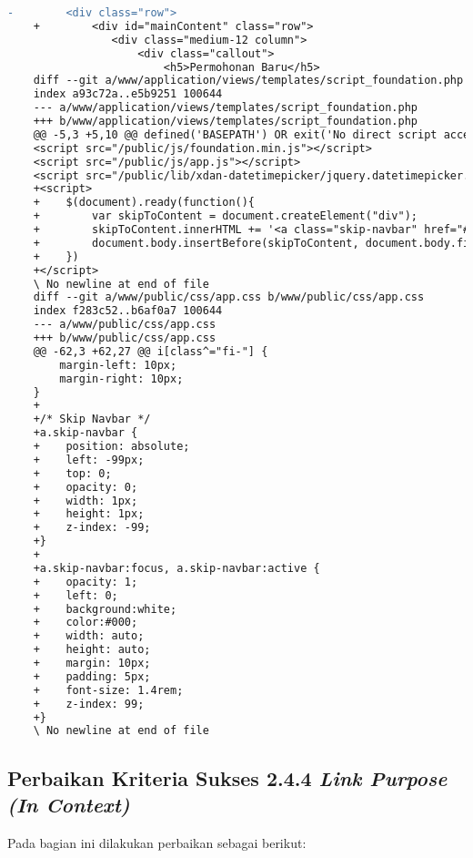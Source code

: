 \begin{lstlisting}[frame=single, label={lst:perbaikan_2.4.1_bypass_blocks}, language=diff, caption=Perbaikan Kriteria Sukses 2.4.1 - Mekanisme untuk Melompati Area Konten yang Berulang]
    -        <div class="row">
    +        <div id="mainContent" class="row">
                <div class="medium-12 column">
                    <div class="callout">
                        <h5>Permohonan Baru</h5>
    diff --git a/www/application/views/templates/script_foundation.php b/www/application/views/templates/script_foundation.php
    index a93c72a..e5b9251 100644
    --- a/www/application/views/templates/script_foundation.php
    +++ b/www/application/views/templates/script_foundation.php
    @@ -5,3 +5,10 @@ defined('BASEPATH') OR exit('No direct script access allowed');
    <script src="/public/js/foundation.min.js"></script>
    <script src="/public/js/app.js"></script>
    <script src="/public/lib/xdan-datetimepicker/jquery.datetimepicker.full.min.js"></script>
    +<script>
    +    $(document).ready(function(){
    +        var skipToContent = document.createElement("div");
    +        skipToContent.innerHTML += '<a class="skip-navbar" href="#mainContent">Lompat ke menu utama</a>';
    +        document.body.insertBefore(skipToContent, document.body.firstChild);
    +    })
    +</script>
    \ No newline at end of file
    diff --git a/www/public/css/app.css b/www/public/css/app.css
    index f283c52..b6af0a7 100644
    --- a/www/public/css/app.css
    +++ b/www/public/css/app.css
    @@ -62,3 +62,27 @@ i[class^="fi-"] {
        margin-left: 10px;
        margin-right: 10px;    
    }
    +
    +/* Skip Navbar */
    +a.skip-navbar {
    +    position: absolute;
    +    left: -99px;
    +    top: 0;
    +    opacity: 0;
    +    width: 1px;
    +    height: 1px;
    +    z-index: -99;
    +}
    +
    +a.skip-navbar:focus, a.skip-navbar:active {
    +    opacity: 1;
    +    left: 0;
    +    background:white;
    +    color:#000;
    +    width: auto;
    +    height: auto;
    +    margin: 10px;
    +    padding: 5px;
    +    font-size: 1.4rem;
    +    z-index: 99;
    +}
    \ No newline at end of file
\end{lstlisting}

\subsection{Perbaikan Kriteria Sukses 2.4.4 \textit{Link Purpose (In Context)}}
\label{subsec:perbaikan_kriteria_sukses_2.4.4}
Pada bagian ini dilakukan perbaikan sebagai berikut:

